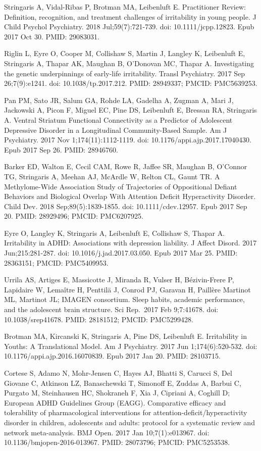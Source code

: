 \documentclass[
]{article}
\begin{document}
Stringaris A, Vidal-Ribas P, Brotman MA, Leibenluft E. Practitioner
Review: Definition, recognition, and treatment challenges of
irritability in young people. J Child Psychol Psychiatry. 2018
Jul;59(7):721-739. doi: 10.1111/jcpp.12823. Epub 2017 Oct 30. PMID:
29083031.

Riglin L, Eyre O, Cooper M, Collishaw S, Martin J, Langley K, Leibenluft
E, Stringaris A, Thapar AK, Maughan B, O'Donovan MC, Thapar A.
Investigating the genetic underpinnings of early-life irritability.
Transl Psychiatry. 2017 Sep 26;7(9):e1241. doi: 10.1038/tp.2017.212.
PMID: 28949337; PMCID: PMC5639253.

Pan PM, Sato JR, Salum GA, Rohde LA, Gadelha A, Zugman A, Mari J,
Jackowski A, Picon F, Miguel EC, Pine DS, Leibenluft E, Bressan RA,
Stringaris A. Ventral Striatum Functional Connectivity as a Predictor of
Adolescent Depressive Disorder in a Longitudinal Community-Based Sample.
Am J Psychiatry. 2017 Nov 1;174(11):1112-1119. doi:
10.1176/appi.ajp.2017.17040430. Epub 2017 Sep 26. PMID: 28946760.

Barker ED, Walton E, Cecil CAM, Rowe R, Jaffee SR, Maughan B, O'Connor
TG, Stringaris A, Meehan AJ, McArdle W, Relton CL, Gaunt TR. A
Methylome-Wide Association Study of Trajectories of Oppositional Defiant
Behaviors and Biological Overlap With Attention Deficit Hyperactivity
Disorder. Child Dev. 2018 Sep;89(5):1839-1855. doi: 10.1111/cdev.12957.
Epub 2017 Sep 20. PMID: 28929496; PMCID: PMC6207925.

Eyre O, Langley K, Stringaris A, Leibenluft E, Collishaw S, Thapar A.
Irritability in ADHD: Associations with depression liability. J Affect
Disord. 2017 Jun;215:281-287. doi: 10.1016/j.jad.2017.03.050. Epub 2017
Mar 25. PMID: 28363151; PMCID: PMC5409953.

Urrila AS, Artiges E, Massicotte J, Miranda R, Vulser H, Bézivin-Frere
P, Lapidaire W, Lemaître H, Penttilä J, Conrod PJ, Garavan H, Paillère
Martinot ML, Martinot JL; IMAGEN consortium. Sleep habits, academic
performance, and the adolescent brain structure. Sci Rep.~2017 Feb
9;7:41678. doi: 10.1038/srep41678. PMID: 28181512; PMCID: PMC5299428.

Brotman MA, Kircanski K, Stringaris A, Pine DS, Leibenluft E.
Irritability in Youths: A Translational Model. Am J Psychiatry. 2017 Jun
1;174(6):520-532. doi: 10.1176/appi.ajp.2016.16070839. Epub 2017 Jan 20.
PMID: 28103715.

Cortese S, Adamo N, Mohr-Jensen C, Hayes AJ, Bhatti S, Carucci S, Del
Giovane C, Atkinson LZ, Banaschewski T, Simonoff E, Zuddas A, Barbui C,
Purgato M, Steinhausen HC, Shokraneh F, Xia J, Cipriani A, Coghill D;
European ADHD Guidelines Group (EAGG). Comparative efficacy and
tolerability of pharmacological interventions for
attention-deficit/hyperactivity disorder in children, adolescents and
adults: protocol for a systematic review and network meta-analysis. BMJ
Open. 2017 Jan 10;7(1):e013967. doi: 10.1136/bmjopen-2016-013967. PMID:
28073796; PMCID: PMC5253538.
\end{document}
